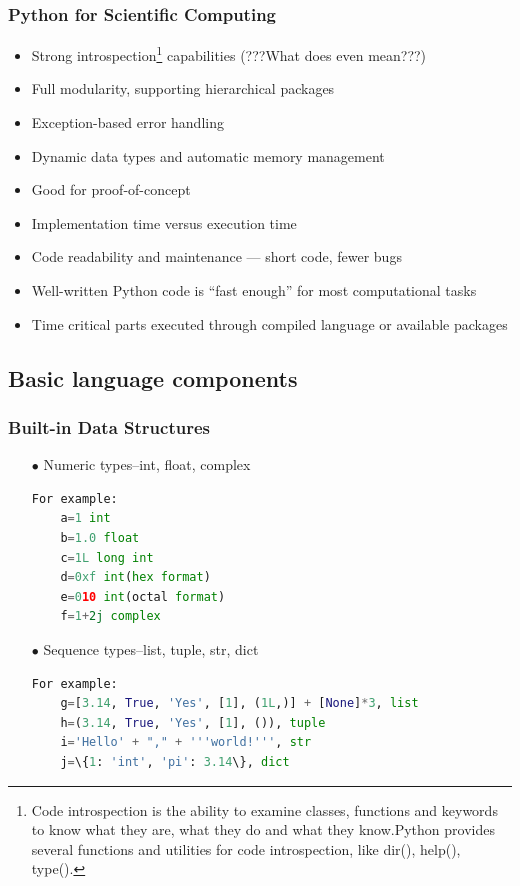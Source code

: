
\begin{frame}
  \MyLogo
  \frametitle{Python for Scientific Computing}  

\small

\begin{itemize}
	\item Strong introspection\footnote {Code introspection is the ability to examine classes, functions and keywords to know what they are, what they do and what they know.Python provides several functions and utilities for code introspection, like dir(), help(), type().} capabilities (???What does even mean???)
	
	\item Full modularity, supporting hierarchical packages
	\item Exception-based error handling
	\item Dynamic data types and automatic memory management
\end{itemize}

\begin{itemize}
	\item Good for proof-of-concept
	\item Implementation time versus execution time
	\item Code readability and maintenance --- short code, fewer bugs
	\item Well-written Python code is ``fast enough'' for most computational tasks
	\item Time critical parts executed through compiled language or \alert{available packages}
\end{itemize}

\end{frame}

\subsection{Basic language components}

\begin{frame}[fragile]
  \MyLogo
  \frametitle{Built-in Data Structures}  
\small

\begin{itemize}
	\item[$\bullet$] Numeric types--int, float, complex
	\begin{lstlisting}[language=python]
	For example:
	a=1 int
	b=1.0 float
	c=1L long int
	d=0xf int(hex format)
	e=010 int(octal format)
	f=1+2j complex
	\end{lstlisting}

	\item[$\bullet$] Sequence types--list, tuple, str, dict
	\begin{lstlisting}[language=python]
	For example:
	g=[3.14, True, 'Yes', [1], (1L,)] + [None]*3, list
	h=(3.14, True, 'Yes', [1], ()), tuple
	i='Hello' + "," + '''world!''', str
	j=\{1: 'int', 'pi': 3.14\}, dict
	\end{lstlisting}
\end{itemize}
\end{frame}

